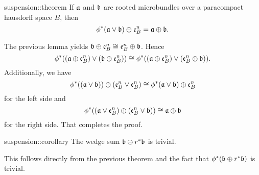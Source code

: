 \begin{mytheorem}{suspension::theorem}{}
    If $\mathfrak{a}$ and $\mathfrak{b}$ are rooted microbundles
    over a paracompact hausdorff space $B$, then
    \[ \phi^*(\mathfrak{a} \vee \mathfrak{b}) \oplus{} \mathfrak{e}^{n}_{B} = \mathfrak{a} \oplus{} \mathfrak{b}. \]
\end{mytheorem}

\begin{myproof}
    The previous lemma yields $\mathfrak{b} \oplus{} \mathfrak{e}^{n}_{B} \cong \mathfrak{e}^{n}_{B} \oplus{} \mathfrak{b}$.
    Hence
    \[
        \phi^*((\mathfrak{a} \oplus{} \mathfrak{e}^{n}_{B}) \vee (\mathfrak{b} \oplus{} \mathfrak{e}^{n}_{B}))
        \cong \phi^*((\mathfrak{a} \oplus{} \mathfrak{e}^{n}_{B}) \vee (\mathfrak{e}^{n}_{B} \oplus{} \mathfrak{b})).
    \]
    Additionally, we have
    \[
        \phi^*((\mathfrak{a} \vee \mathfrak{b})) \oplus{} (\mathfrak{e}^{n}_{B} \vee \mathfrak{e}^{n}_{B})
        \cong \phi^*(\mathfrak{a} \vee \mathfrak{b}) \oplus{} \mathfrak{e}^{n}_{B}
    \]
    for the left side and
    \[
        \phi^*((\mathfrak{a} \vee \mathfrak{e}^{n}_{B}) \oplus{} (\mathfrak{e}^{n}_{B} \vee \mathfrak{b}))
        \cong \mathfrak{a} \oplus{} \mathfrak{b}
    \]
    for the right side. That completes the proof.
\end{myproof}

\begin{mycorollary}{suspension::corollary}{}
    The wedge sum $\mathfrak{b} \oplus{} r^*\mathfrak{b}$ is trivial.
\end{mycorollary}

\begin{myproof}
    This follows directly from the previous theorem and
    the fact that $\phi^*(\mathfrak{b} \oplus{} r^*\mathfrak{b})$ is trivial.
\end{myproof}
